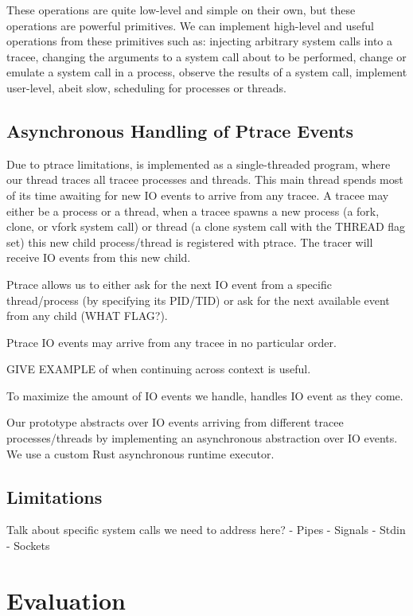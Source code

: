 These operations are quite low-level and simple on their own, but these operations are powerful
primitives. We can implement high-level and useful operations from these primitives such as:
injecting arbitrary system calls into a tracee, changing the arguments to a system call about to
be performed, change or emulate a system call in a process, observe the results of a system call,
implement user-level, abeit slow, scheduling for processes or threads.

\subsection{Asynchronous Handling of Ptrace Events}

Due to ptrace limitations, \pc is implemented as a single-threaded program, where our thread traces all
tracee processes and threads. This main thread spends most of its time awaiting for new IO events to arrive
from any tracee. A tracee may either be a process or a thread, when a tracee spawns a new process (a fork, clone, or vfork system call) or thread (a clone system call with the THREAD flag set) this new child process/thread is registered with ptrace. The tracer will receive IO events from this new child.

Ptrace allows us to either ask for the next IO event from a specific thread/process (by specifying its PID/TID) or ask for the next available event from any child (WHAT FLAG?).


Ptrace IO events may arrive from any tracee in no particular order. 

GIVE EXAMPLE of when continuing across context is useful.

To maximize the amount of IO events we handle, \pc handles IO event as they come.

Our prototype abstracts over IO events arriving from different tracee processes/threads by implementing an
asynchronous abstraction over IO events. We use a custom Rust asynchronous runtime executor.

\subsection{Limitations}
Talk about specific system calls we need to address here?
- Pipes
- Signals
- Stdin
- Sockets

\section{Evaluation}

